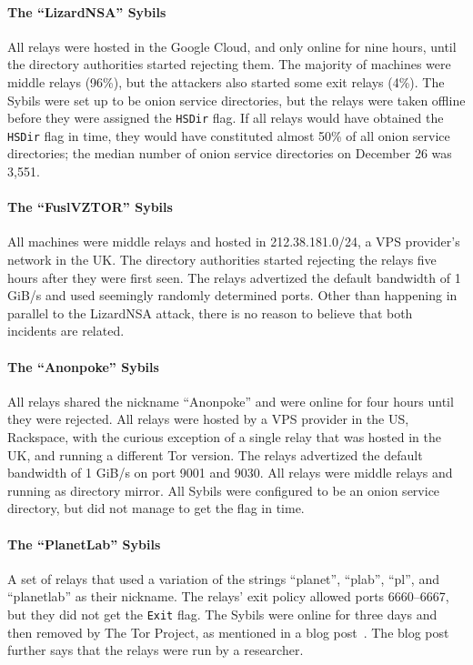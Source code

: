 \paragraph{The ``LizardNSA'' Sybils}
All relays were hosted in the Google Cloud, and only online for nine hours,
until the directory authorities started rejecting them.  The majority of
machines were middle relays (96\%), but the attackers also started some exit
relays (4\%).  The Sybils were set up to be onion service directories, but the
relays were taken offline before they were assigned the \texttt{HSDir} flag.  If
all relays would have obtained the \texttt{HSDir} flag in time, they would have
constituted almost 50\% of all onion service directories; the median number of
onion service directories on December 26 was 3,551.

\paragraph{The ``FuslVZTOR'' Sybils}
All machines were middle relays and hosted in 212.38.181.0/24, a VPS provider's
network in the UK.  The directory authorities started rejecting the relays five
hours after they were first seen.  The relays advertized the default bandwidth
of 1 GiB/s and used seemingly randomly determined ports.  Other than happening
in parallel to the LizardNSA attack, there is no reason to believe that both
incidents are related.

\paragraph{The ``Anonpoke'' Sybils}
All relays shared the nickname ``Anonpoke'' and were online for four hours until
they were rejected.  All relays were hosted by a VPS provider in the US,
Rackspace, with the curious exception of a single relay that was hosted in the
UK, and running a different Tor version.  The relays advertized the default
bandwidth of 1 GiB/s on port 9001 and 9030.  All relays were middle relays and
running as directory mirror.  All Sybils were configured to be an onion service
directory, but did not manage to get the flag in time.

\paragraph{The ``PlanetLab'' Sybils}
A set of relays that used a variation of the strings ``planet'', ``plab'',
``pl'', and ``planetlab'' as their nickname.  The relays' exit policy allowed
ports 6660--6667, but they did not get the \texttt{Exit} flag.  The Sybils were
online for three days and then removed by The Tor Project, as mentioned in a
blog post~\cite{progressreport}.  The blog post further says that the relays
were run by a researcher.

